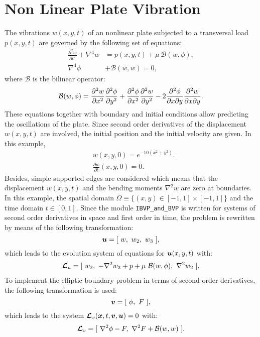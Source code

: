      
       
\newpage      
\section{Non Linear Plate Vibration}
The vibrations $ w(x,y,t)$  of an nonlinear plate subjected to a transversal load $ p(x,y,t) $ are governed by the following set of equations: 
\begin{align*}
\frac{\partial^2{w}}{\partial{t}^2}+ \nabla^4{w}
&= p(x,y,t) + \mu \ \mathcal{B}(w,\phi), \\ 
\nabla^4 \phi & + \mathcal{B}(w,w) =0 ,
\end{align*}
where $\mathcal{B}$ is the bilinear operator:
%
\begin{align*}
	\mathcal{B}(w,\phi) 
	= 
	\pdv[2]{w}{x}\pdv[2]{\phi}{y}
	+
	\pdv[2]{\phi}{x}\pdv[2]{w}{y}
	-
	2\pdv[2]{\phi}{x}{y}\pdv[2]{w}{x}{y}.
\end{align*}
These equations together with boundary and initial conditions allow predicting the oscillations of the plate. Since second order derivatives of the displacement $ w(x,y,t) $ are involved, the initial position and the initial velocity are given. In this example, 
\begin{align*}
& w(x,y,0)  =   e^{-10(x^2+y^2)}. \\ 
& \frac{\partial w}{\partial t} (x,y,0) = 0. 
\end{align*} 
Besides, simple supported edges are considered which means that the displacement  $ w(x,y,t) $ and the bending moments $ \nabla^2  w $ are zero at boundaries. 
In this example, the  spatial domain $\Omega \equiv \{ (x,y) \in [-1,1] \times [-1,1] \}$ and the time domain  $t \in [0,1]$.
Since the module \verb|IBVP_and_BVP| is written for systems of second order derivatives in space and first order in time, the problem is rewritten by means of the following transformation:
        \begin{equation*}
           \boldsymbol{u} = [ \  w, \ w_2, \ w_3 \ ],
        \end{equation*}
        which leads to the evolution system of equations for $ \boldsymbol{u}(x,y,t) $ with: 
        \begin{align*}
                    \boldsymbol{\mathcal{L}}_u = [ \  w_2, \  -\nabla^2 w_3 + p + \mu \ \mathcal{B}(w, \phi),  \ \nabla^2 w_2 \ ],
       \end{align*} 
To implement the elliptic boundary problem in terms of second order derivatives, the following transformation is used:
                       \begin{equation*}
                          \boldsymbol{v} = [ \ \phi, \ F \ ],
                       \end{equation*}
which leads to the system  $ \boldsymbol{\mathcal{L}}_v (\boldsymbol{x},t,\boldsymbol{v},\boldsymbol{u}) = 0 $ with: 
        \begin{align*}
                   \boldsymbol{\mathcal{L}}_v = [ \  \nabla^2 \phi - F, \  \nabla^2 F +  \mathcal{B}(w, w) \ ].
        \end{align*}
        
